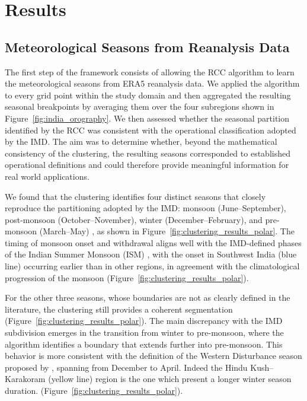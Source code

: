 \section{Results}

\subsection{Meteorological Seasons from Reanalysis Data}

The first step of the framework consists of allowing the RCC algorithm to learn the meteorological seasons from ERA5 reanalysis data. We applied the algorithm to every grid point within the study domain and then aggregated the resulting seasonal breakpoints by averaging them over the four subregions shown in Figure~\ref{fig:india_orography}. We then assessed whether the seasonal partition identified by the RCC was consistent with the operational classification adopted by the IMD. The aim was to determine whether, beyond the mathematical consistency of the clustering, the resulting seasons corresponded to established operational definitions and could therefore provide meaningful information for real world applications.

We found that the clustering identifies four distinct seasons that closely reproduce the partitioning adopted by the IMD: monsoon (June--September), post-monsoon (October--November), winter (December--February), and pre-monsoon (March--May) \citep{praveen_analyzing_2020}, as shown in Figure~\ref{fig:clustering_results_polar}.  
The timing of monsoon onset and withdrawal aligns well with the IMD-defined phases of the Indian Summer Monsoon (ISM) \cite{pai_normal_2020}, with the onset in Southwest India (blue line) occurring earlier than in other regions, in agreement with the climatological progression of the monsoon (Figure~\ref{fig:clustering_results_polar}).  

For the other three seasons, whose boundaries are not as clearly defined in the literature, the clustering still provides a coherent segmentation (Figure~\ref{fig:clustering_results_polar}).  
The main discrepancy with the IMD subdivision emerges in the transition from winter to pre-monsoon, where the algorithm identifies a boundary that extends further into pre-monsoon.  
This behavior is more consistent with the definition of the Western Disturbance season proposed by \citet{palazzi_precipitation_2013}, spanning from December to April. Indeed the Hindu Kush-- Karakoram (yellow line) region is the one which present a longer winter season duration.  (Figure~\ref{fig:clustering_results_polar}). 

